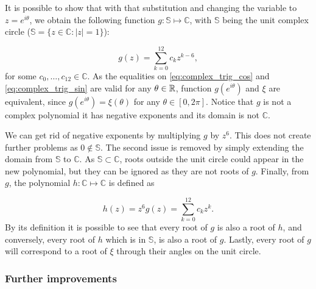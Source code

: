 It is possible to show that with that substitution and changing the variable to $z=e^{i\theta}$, we obtain the following function $g : \mathbb{S} \mapsto \mathbb{C}$, with $\mathbb{S}$ being the unit complex circle ($\mathbb{S} = \{z \in \mathbb{C} : |z|=1\}$):

\begin{equation}
g(z)=\sum_{k=0}^{12} c_k z^{k-6},
\end{equation}
for some $c_0, \dots, c_{12} \in \mathbb{C}$. As the equalities on \autoref{eq:complex_trig_cos} and \autoref{eq:complex_trig_sin} are valid for any $\theta \in \mathbb{R}$, function $g(e^{i\theta})$ and $\xi$ are equivalent, since $g(e^{i\theta}) = \xi(\theta)$ for any $\theta \in [0, 2\pi]$. Notice that $g$ is not a complex polynomial it has negative exponents and its domain is not $\mathbb{C}$.

We can get rid of negative exponents by multiplying $g$ by $z^6$. This does not create further problems as $0\not\in \mathbb{S}$. The second issue is removed by simply extending the domain from $\mathbb{S}$ to $\mathbb{C}$. 
As $\mathbb{S} \subset \mathbb{C}$, roots outside the unit circle could appear in the new polynomial, but they can be ignored as they are not roots of $g$.
Finally, from $g$, the polynomial $h : \mathbb{C} \mapsto \mathbb{C}$ is defined as

\begin{equation}\label{eq:h}
h(z) = z^6 g(z) = \sum_{k=0}^{12} c_k z^k.
\end{equation}
By its definition it is possible to see that every root of $g$ is also a root of $h$, and conversely, every root of $h$ which is in $\mathbb{S}$, is also a root of $g$. Lastly, every root of $g$ will correspond to a root of $\xi$ through their angles on the unit circle.

\subsubsection{Further improvements}

